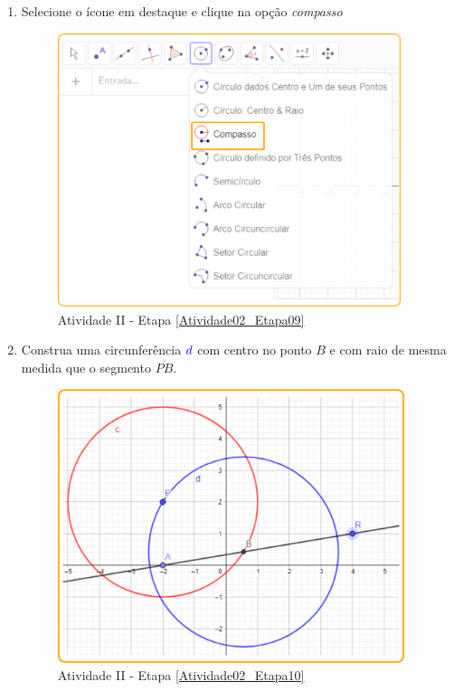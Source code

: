 \documentclass[11pt,a4paper]{article}
\begin{document}
\begin{enumerate}[{Etapa} 1.]
\item Selecione o ícone em destaque e clique na opção {\it compasso} \label{Atividade02_Etapa09}
\begin{figure}[H]
    \centering
    \includegraphics[height=8cm]{Figuras/T01_Elemento04.png}
    \caption{Atividade II - Etapa \ref{Atividade02_Etapa09}}
    \label{Atividade02_Etapa09_Imagem}
\end{figure}

\item Construa uma circunferência ${\color{blue}{d}}$  com centro no ponto $B$ e com raio de mesma medida que o segmento $\overline{PB}$. \label{Atividade02_Etapa10}
\begin{figure}[H]
    \centering
    \includegraphics[height=8cm]{Figuras/T01_Atividade02_Fig05.png}
    \caption{Atividade II - Etapa \ref{Atividade02_Etapa10}}
    \label{Atividade02_Etapa10_Imagem}
\end{figure}


\end{enumerate}
\end{document}
